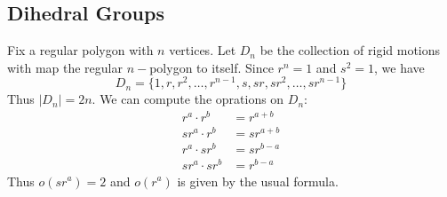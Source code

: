 \documentclass[12pt, a4paper]{book}
\theoremstyle{nonumberplain}
\begin{document}
\subsection{Dihedral Groups}
Fix a regular polygon with $n$ vertices.
Let $D_n$ be the collection of rigid motions with map the regular $n-$polygon to itself.
Since $r^n=1$ and $s^2=1$, we have
\[D_n=\{1,r,r^2,\ldots,r^{n-1},s,sr,sr^2,\ldots,sr^{n-1}\}\]
Thus $|D_n|=2n$.
We can compute the oprations on $D_n$:
\begin{align*}
    r^a\cdot r^b &= r^{a+b}\\
    sr^a\cdot r^b &= sr^{a+b}\\
    r^a\cdot sr^b &= sr^{b-a}\\
    sr^a\cdot sr^b &= r^{b-a}
\end{align*}
Thus $o(sr^a)=2$ and $o(r^a)$ is given by the usual formula.
\end{document}
